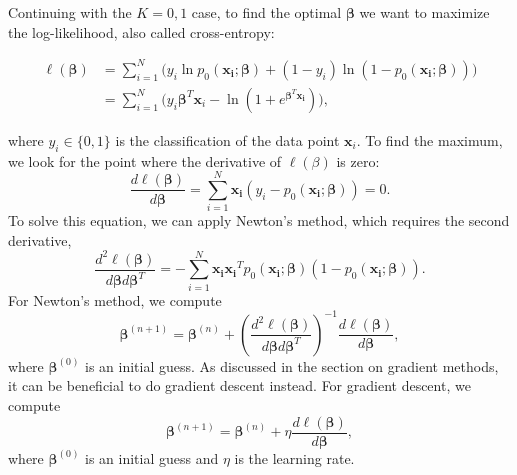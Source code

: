 \documentclass[aps,reprint,superscriptaddress,nofootinbib]{revtex4-2}
\begin{document}
Continuing with the \(K=0,1\) case, to find the optimal \(\bm{\beta}\) we want to maximize the log-likelihood, also called cross-entropy:
\begin{small}
\begin{align*}
    \ell(\bm{\beta})&=\sum_{i=1}^N\Big(y_i\ln{p_0(\bm{x_i};\bm{\beta})} + (1-y_i)\ln(1 - p_0(\bm{x_i};\bm{\beta}))\Big)
    \\
    &=\sum_{i=1}^N\Big(y_i\bm{\beta}^T\bm{x}_i - \ln(1 + e^{\bm{\beta}^T\bm{x_i}})\Big),
\end{align*}
\end{small}
where \(y_i\in\{0,1\}\) is the classification of the data point \(\bm{x}_i\). To find the maximum, we look for the point where the derivative of \(\ell(\beta)\) is zero:
\begin{equation*}
    \frac{d\ell(\bm{\beta})}{d\bm{\beta}} = \sum_{i=1}^N\bm{x_i}(y_i - p_0(\bm{x_i};\bm{\beta}))=0.
\end{equation*}
To solve this equation, we can apply Newton's method, which requires the second derivative,
\begin{equation*}
    \frac{d^2\ell(\bm{\beta})}{d\bm{\beta}d\bm{\beta}^T} = -\sum_{i=1}^N\bm{x_i}\bm{x_i}^Tp_0(\bm{x_i};\bm{\beta})(1 - p_0(\bm{x_i};\bm{\beta})).
\end{equation*}
For Newton's method, we compute
\begin{equation*}
    \bm{\beta}^{(n+1)}=\bm{\beta}^{(n)}+\left(\frac{d^2\ell(\bm{\beta})}{d\bm{\beta}d\bm{\beta}^T}\right)^{-1}\frac{d\ell(\bm{\beta})}{d\bm{\beta}},
\end{equation*}
where \(\bm{\beta}^{(0)}\) is an initial guess. As discussed in the section on gradient methods, it can be beneficial to do gradient descent instead. For gradient descent, we compute
\begin{equation*}
    \bm{\beta}^{(n+1)}=\bm{\beta}^{(n)}+\eta\frac{d\ell(\bm{\beta})}{d\bm{\beta}},
\end{equation*}
where \(\bm{\beta}^{(0)}\) is an initial guess and \(\eta\) is the learning rate.
\end{document}
